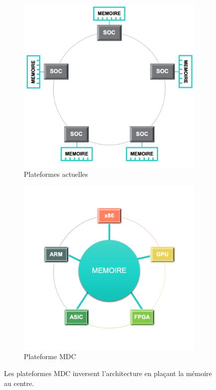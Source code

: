             \begin{figure}[t!]
                \centering
                \begin{subfigure}[t]{0.49\textwidth}
                    \centering
                    \includegraphics[width=\linewidth]{images/edl_mdc_old.png}
                    \caption{\label{fig:edl_mdc_old} Plateformes actuelles}
                \end{subfigure}\hfill
                \begin{subfigure}[t]{0.49\textwidth}
                    \centering
                    \includegraphics[width=\linewidth]{images/edl_mdc_new.png}
                    \caption{\label{fig:edl_mdc_new}Plateforme MDC}
                \end{subfigure}
                \caption{\label{fig:edl_mdc} Les plateformes MDC inversent l'architecture en plaçant la mémoire au centre.}
            \end{figure}

